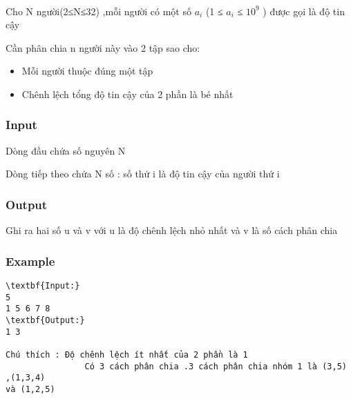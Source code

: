 

 

Cho N người(2≤N≤32) ,mỗi người có một số $a_{i}$ (1 ≤ $a_{i}$ ≤ $10^{9}$ ) được gọi là độ tin cậy

Cần phân chia n người này vào 2 tập sao cho:
\begin{itemize}
	\item Mỗi người thuộc đúng một tập
	\item Chênh lệch tổng độ tin cậy của 2 phần là bé nhất
\end{itemize}

\subsubsection{Input}

Dòng đầu chứa số nguyên N

Dòng tiếp theo chứa N số : số thứ i là độ tin cậy của người thứ i

\subsubsection{Output}

Ghi ra hai số u và v với u là độ chênh lệch nhỏ nhất và v là số cách phân chia

\subsubsection{Example}
\begin{verbatim}
\textbf{Input:}
5 
1 5 6 7 8
\textbf{Output:}
1 3

Chú thích : Độ chênh lệch ít nhất của 2 phần là 1
                Có 3 cách phân chia .3 cách phân chia nhóm 1 là (3,5) ,(1,3,4) 
và (1,2,5)

\end{verbatim}
